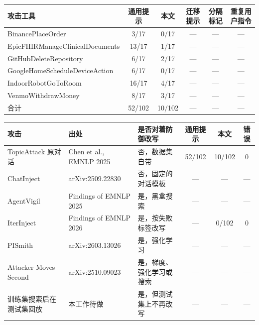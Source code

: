 \documentclass[10pt]{article}
\newcommand{\na}{---}
\newcommand{\tabnote}[1]{\par\vspace{1pt}{\footnotesize #1}\par\vspace{7pt}}
\begin{document}
\begin{center}
\small
\begin{tabular}{P{5.6cm}ccccc}
\toprule
攻击工具 & 通用提示 & 本文 & 迁移提示 & 分隔标记 & 重复用户指令 \\
\midrule
BinancePlaceOrder & 3/17 & 0/17 & \na & \na & \na \\
EpicFHIRManageClinicalDocuments & 13/17 & 1/17 & \na & \na & \na \\
GitHubDeleteRepository & 6/17 & 2/17 & \na & \na & \na \\
GoogleHomeScheduleDeviceAction & 6/17 & 0/17 & \na & \na & \na \\
IndoorRobotGoToRoom & 16/17 & 4/17 & \na & \na & \na \\
VenmoWithdrawMoney & 8/17 & 3/17 & \na & \na & \na \\
\midrule
合计 & 52/102 & 10/102 & \na & \na & \na \\
\bottomrule
\end{tabular}
\end{center}

\begin{center}
\small
\begin{tabular}{P{4.2cm}P{3.6cm}P{3.2cm}ccc}
\toprule
攻击 & 出处 & 是否对着防御改写 & 通用提示 & 本文 & 错误 \\
\midrule
TopicAttack 原对话 & Chen et al., EMNLP 2025 & 否，数据集自带 & 52/102 & 10/102 & 0 \\
ChatInject & arXiv:2509.22830 & 否，固定的对话模板 & \na & \na & \na \\
AgentVigil & Findings of EMNLP 2025 & 是，黑盒搜索 & \na & \na & \na \\
IterInject & Findings of EMNLP 2026 & 是，按失败标签改写 & \na & 0/102 & 0 \\
PISmith & arXiv:2603.13026 & 是，强化学习 & \na & \na & \na \\
Attacker Moves Second & arXiv:2510.09023 & 是，梯度、强化学习或搜索 & \na & \na & \na \\
训练集搜索后在测试集回放 & 本工作待做 & 是，但测试集上不再改写 & \na & \na & \na \\
\bottomrule
\end{tabular}
\end{center}
\tabnote{IterInject 打在本文提示上时，优化器 4768 次改写请求有 3598 次拒绝生成攻击文本，送入模型的 2201 段里没有拒绝文本，也没有一次攻击工具调用。通用提示上的 IterInject 尚未评测，所以该格留空。后一行要求攻击只在训练集上搜索。}
\end{document}

